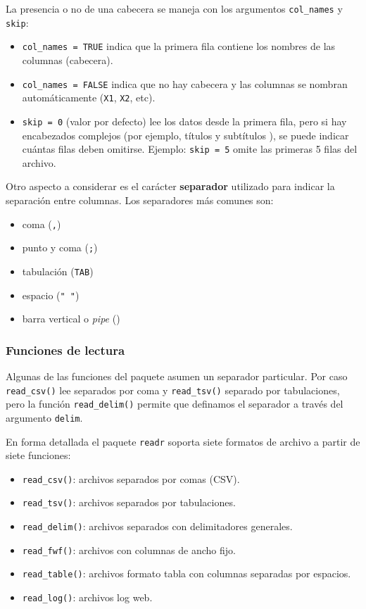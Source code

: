 \documentclass[
  spanish,
  a4paper,
]{scrbook}
\providecommand{\tightlist}{%
  \setlength{\itemsep}{0pt}\setlength{\parskip}{0pt}}
\begin{document}
La presencia o no de una cabecera se maneja con los argumentos
\texttt{col\_names} y \texttt{skip}:

\begin{itemize}
\item
  \texttt{col\_names\ =\ TRUE} indica que la primera fila contiene los
  nombres de las columnas (cabecera).
\item
  \texttt{col\_names\ =\ FALSE} indica que no hay cabecera y las
  columnas se nombran automáticamente (\texttt{X1}, \texttt{X2}, etc).
\item
  \texttt{skip\ =\ 0} (valor por defecto) lee los datos desde la primera
  fila, pero si hay encabezados complejos (por ejemplo, títulos y
  subtítulos ), se puede indicar cuántas filas deben omitirse. Ejemplo:
  \texttt{skip\ =\ 5} omite las primeras 5 filas del archivo.
\end{itemize}

Otro aspecto a considerar es el carácter \textbf{separador} utilizado
para indicar la separación entre columnas. Los separadores más comunes
son:

\begin{itemize}
\item
  coma (\texttt{,})
\item
  punto y coma (\texttt{;})
\item
  tabulación (\texttt{TAB})
\item
  espacio (\texttt{"\ "})
\item
  barra vertical o \emph{pipe} (\texttt{\textbar{}})
\end{itemize}

\subsubsection{Funciones de lectura}\label{funciones-de-lectura}

Algunas de las funciones del paquete asumen un separador particular. Por
caso \texttt{read\_csv()} lee separados por coma y \texttt{read\_tsv()}
separado por tabulaciones, pero la función \texttt{read\_delim()}
permite que definamos el separador a través del argumento
\texttt{delim}.

En forma detallada el paquete \texttt{readr} soporta siete formatos de
archivo a partir de siete funciones:

\begin{itemize}
\tightlist
\item
  \texttt{read\_csv()}: archivos separados por comas (CSV).
\item
  \texttt{read\_tsv()}: archivos separados por tabulaciones.
\item
  \texttt{read\_delim()}: archivos separados con delimitadores
  generales.
\item
  \texttt{read\_fwf()}: archivos con columnas de ancho fijo.
\item
  \texttt{read\_table()}: archivos formato tabla con columnas separadas
  por espacios.
\item
  \texttt{read\_log()}: archivos log web.
\end{itemize}
\end{document}
